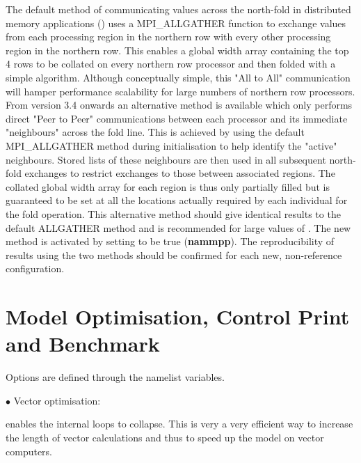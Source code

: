The default method of communicating values across the north-fold in distributed memory applications
() uses a \textsc{MPI\_ALLGATHER} function to exchange values from each processing
region in the northern row with every other processing region in the northern row. This enables a
global width array containing the top 4 rows to be collated on every northern row processor and then
folded with a simple algorithm. Although conceptually simple, this "All to All" communication will
hamper performance scalability for large numbers of northern row processors. From version 3.4
onwards an alternative method is available which only performs direct "Peer to Peer" communications
between each processor and its immediate "neighbours" across the fold line. This is achieved by
using the default \textsc{MPI\_ALLGATHER} method during initialisation to help identify the "active"
neighbours. Stored lists of these neighbours are then used in all subsequent north-fold exchanges to
restrict exchanges to those between associated regions. The collated global width array for each
region is thus only partially filled but is guaranteed to be set at all the locations actually
required by each individual for the fold operation. This alternative method should give identical
results to the default \textsc{ALLGATHER} method and is recommended for large values of .
The new method is activated by setting  to be true ({\bf nammpp}). The
reproducibility of results using the two methods should be confirmed for each new, non-reference
configuration.

\section{Model Optimisation, Control Print and Benchmark}
\label{MISC_opt}

Options are defined through the   namelist variables.

$\bullet$ Vector optimisation:

 enables the internal loops to collapse. This is very 
a very efficient way to increase the length of vector calculations and thus 
to speed up the model on vector computers.
 
